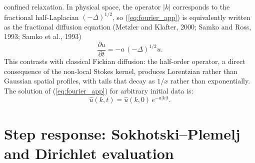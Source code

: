\documentclass[12pt]{article}
\begin{document}
confined relaxation. In physical space, the operator $|k|$ corresponds to the
fractional half-Laplacian $(-\Delta)^{1/2}$, so (\ref{eq:fourier_app}) is
equivalently written as the fractional diffusion equation
(Metzler and Klafter, 2000; Samko and Ross, 1993; Samko et al., 1993)
\begin{equation}
\frac{\partial u}{\partial t} = -a\,(-\Delta)^{1/2}u.
\end{equation}
This contrasts with classical Fickian diffusion: the half-order operator, a
direct consequence of the non-local Stokes kernel, produces Lorentzian rather
than Gaussian spatial profiles, with tails that decay as $1/x$ rather than
exponentially. The solution of (\ref{eq:fourier_app}) for arbitrary initial data is:
\begin{equation}
\hat{u}(k,t) = \hat{u}(k,0)\,e^{-a|k|t}.
\label{eq:fourier_sol_app}
\end{equation}

\section{Step response: Sokhotski--Plemelj and Dirichlet evaluation}
\label{app:step}
\end{document}
